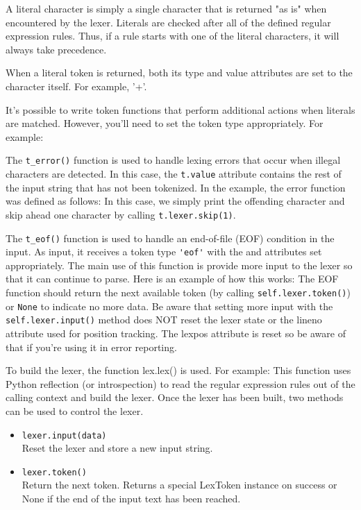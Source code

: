 A literal character is simply a single character that is returned "as is" when
encountered by the lexer. Literals are checked after all of the defined regular
expression rules. Thus, if a rule starts with one of the literal characters, it
will always take precedence.

When a literal token is returned, both its type and value attributes are set to
the character itself. For example, '+'.

It's possible to write token functions that perform additional actions when
literals are matched. However, you'll need to set the token type appropriately.
For example:


The \verb|t_error()| function is used to handle lexing errors that occur when
illegal characters are detected. In this case, the \verb|t.value| attribute
contains the rest of the input string that has not been tokenized. In the
example, the error function was defined as follows:
In this case, we simply print the offending character and skip ahead one
character by calling \verb|t.lexer.skip(1)|.


The \verb|t_eof()| function is used to handle an end-of-file (EOF) condition in
the input. As input, it receives a token type \verb|'eof'| with the 
and  attributes set appropriately. The main use of this function is
provide more input to the lexer so that it can continue to parse.
Here is an example of how this works:
The EOF function should return the next available token (by calling
\verb|self.lexer.token()|) or \verb|None| to indicate no more data. Be aware
that setting more input with the \verb|self.lexer.input()| method does NOT reset
the lexer state or the lineno attribute used for position tracking. The lexpos
attribute is reset so be aware of that if you're using it in error reporting.


To build the lexer, the function lex.lex() is used. For example:
This function uses Python reflection (or introspection) to read the regular
expression rules out of the calling context and build the lexer. Once the lexer
has been built, two methods can be used to control the lexer.
\begin{itemize}[nosep]
  \item 
\verb|lexer.input(data)|\\Reset the lexer and store a new input string.
  \item 
\verb|lexer.token()|\\Return the next token. Returns a special LexToken instance
on success or None if the end of the input text has been reached.
\end{itemize}

